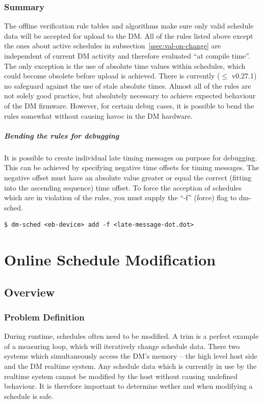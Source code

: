 \subsection{Summary}
The offline verification rule tables and algorithms make sure only valid schedule data will be accepted for upload to the DM.
All of the rules listed above except the ones about active schedules in subsection~\ref{ssec:val-on-change} are independent of current DM activity and therefore evaluated \enquote{at compile time}.
The only exception is the use of absolute time values within schedules, which could become obsolete before upload is achieved. There is currently ($\le$ v0.27.1) no safeguard against the use of stale absolute times.
Almost all of the rules are not solely good practice, but absolutely necessary to achieve expected behaviour of the DM firmware. However, for certain debug cases, it is possible to bend the rules somewhat without causing havoc in the DM hardware.

\paragraph{Bending the rules for debugging}
%
It is possible to create individual late timing messages on purpose for debugging. This can be achieved by specifying negative time offsets for timing messages. The negative offset must have an absolute value greater or equal the correct (fitting into the ascending sequence) time offset. To force the acception of schedules which are in violation of the rules, you must supply the \enquote{-f} (force) flag to dm-sched.
\begin{lstlisting}[style = customshell]
$ dm-sched <eb-device> add -f <late-message-dot.dot>
\end{lstlisting}

\chapter{Online Schedule Modification}
\label{chap:online-sched-mod}
\section{Overview}

\subsection{Problem Definition}

During runtime, schedules often need to be modified. A trim is a perfect example of a measuring loop, which will iteratively change schedule data.
There two systems which simultaneously access the DM's memory -- the high level host side and the DM realtime system.
Any schedule data which is currently in use by the realtime system cannot be modified by the host without causing undefined behaviour.
It is therefore important to determine wether and when modifying a schedule is safe.
